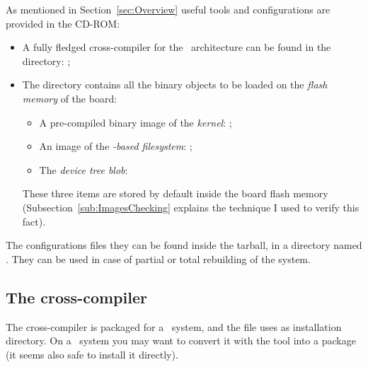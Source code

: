 As mentioned in Section~\ref{sec:Overview} useful tools and configurations
are provided in the CD-ROM:
\begin{itemize}

\item   A fully fledged cross-compiler for the \PPC\ architecture
        can be found in the  directory:
        ;

\item   The  directory contains all the binary
        objects to be loaded on the \emph{flash memory} of the
        board:
        \begin{itemize}
        \item   A pre-compiled binary image of the \emph{kernel}:
                ;
        \item   An image of the \emph{\BusyBox-based filesystem}:
                ;
        \item   The \emph{device tree blob}:
        \end{itemize}
        These three items are stored by default inside the board flash
        memory (Subsection~\ref{sub:ImagesChecking} explains the technique
        I used to verify this fact).

\end{itemize}

The configurations files they can be found inside the
 tarball, in a directory named .
They can be used in case of partial or total rebuilding of the system.


\subsection{ The cross-compiler }

    The cross-compiler is packaged for a \RedHat\ system, and the
     file uses  as installation
    directory. On a \Debian\ system you may want to convert it with
    the  tool into a  package (it seems also
    safe to install it directly).

